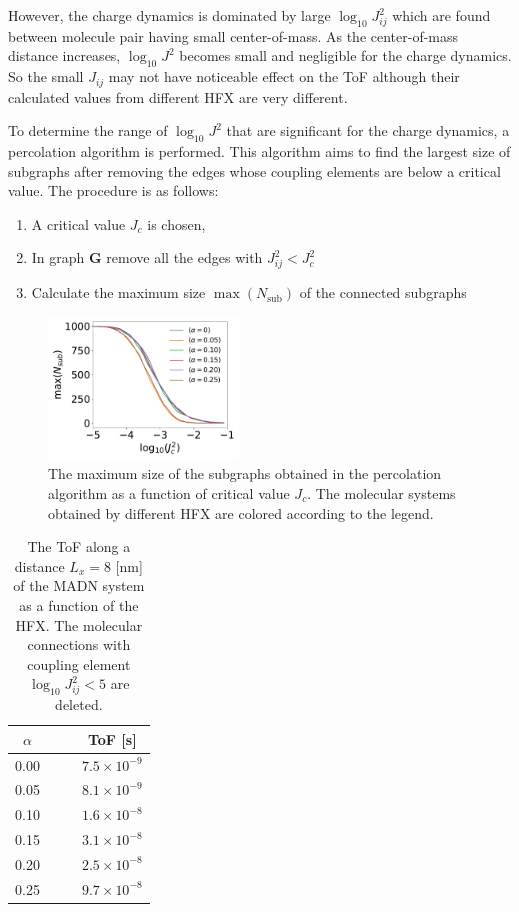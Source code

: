 \documentclass[%
 reprint,
 amsmath,amssymb,
 aps,
]{revtex4-2}
\begin{document}
However, the charge dynamics is dominated by large $\log_{10} J_{ij}^2$ which are found between molecule pair having small center-of-mass. As the center-of-mass distance increases, $\log_{10} J^2$ becomes small and negligible for the charge dynamics. So the small $J_{ij}$ may not have noticeable effect on the ToF although their calculated values from different HFX are very different. 

To determine the range of $\log_{10} J^2$ that are significant for the charge dynamics, a percolation algorithm is performed. This algorithm aims to find the largest size of subgraphs after removing the edges whose coupling elements are below a critical value. The procedure is as follows:
\begin{enumerate}
    \item A critical value $J_c$ is chosen,
    \item In graph $\mathbf{G}$ remove all the edges with $J_{ij}^2 < J_c^2$
    \item Calculate the maximum size $\max({N_\text{sub}})$ of the connected subgraphs
\end{enumerate}

\begin{figure}[btp]
  \centering
  \includegraphics[width=0.45\textwidth]{figs/fig_network_all.pdf}
  \caption{The maximum size of the subgraphs obtained in the percolation algorithm as a function of critical value $J_c$. The molecular systems obtained by different HFX are colored according to the legend.}
  \label{fig:J_percolate}
\end{figure}

\begin{table}[H]
  \caption{\label{tab:ToF_J} The ToF along a distance $L_x = 8$ [nm] of the MADN system as a function of the HFX. The molecular connections with coupling element $\log_{10} J^2_{ij} < 5$ are deleted.}
  \centering
  \begin{tabular}{c c c c }
  \hline
  \hline
      $\alpha$ & & & ToF [s]  \\
  \hline
      0.00 & & &  $7.5 \times 10^{-9}$ \\
      0.05 & & & $ 8.1 \times 10^{-9}$ \\
      0.10 & & & $ 1.6 \times 10^{-8}$ \\
      0.15 & & & $ 3.1 \times 10^{-8}$ \\
      0.20 & & & $ 2.5 \times 10^{-8}$ \\
      0.25 & & & $ 9.7 \times 10^{-8}$ \\
  \hline
  \hline
  \end{tabular}
\end{table}
\end{document}
